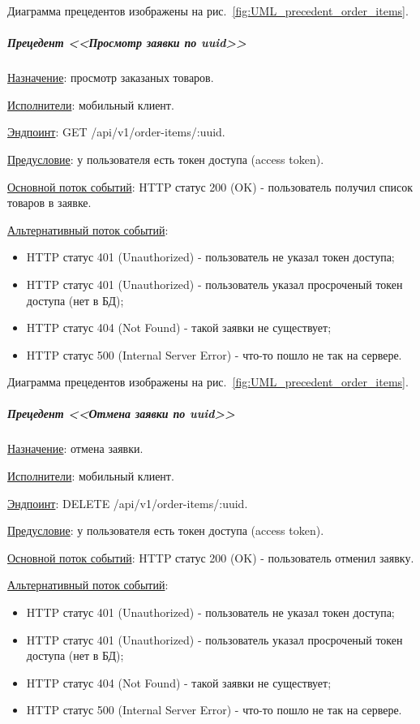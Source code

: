 Диаграмма прецедентов изображены на рис.~\ref{fig:UML_precedent_order_items}.


\subparagraph{Прецедент <<Просмотр заявки по uuid>>} \hspace{0pt}

\underline{Назначение}: просмотр заказаных товаров.

\underline{Исполнители}: мобильный клиент.

\underline{Эндпоинт}: GET /api/v1/order-items/:uuid.

\underline{Предусловие}: у пользователя есть токен доступа (access token).

\underline{Основной поток событий}: HTTP статус 200 (OK) - пользователь получил список товаров в заявке. 

\underline{Альтернативный поток событий}:

\begin{itemize}
    \item HTTP статус 401 (Unauthorized) - пользователь не указал токен доступа;
    \item HTTP статус 401 (Unauthorized) - пользователь указал просроченый токен доступа (нет в БД);
    \item HTTP статус 404 (Not Found) - такой заявки не существует;
    \item HTTP статус 500 (Internal Server Error) - что-то пошло не так на сервере.
\end{itemize}

Диаграмма прецедентов изображены на рис.~\ref{fig:UML_precedent_order_items}.


\subparagraph{Прецедент <<Отмена заявки по uuid>>} \hspace{0pt}

\underline{Назначение}: отмена заявки.

\underline{Исполнители}: мобильный клиент.

\underline{Эндпоинт}: DELETE /api/v1/order-items/:uuid.

\underline{Предусловие}: у пользователя есть токен доступа (access token).

\underline{Основной поток событий}: HTTP статус 200 (OK) - пользователь отменил заявку. 

\underline{Альтернативный поток событий}:

\begin{itemize}
    \item HTTP статус 401 (Unauthorized) - пользователь не указал токен доступа;
    \item HTTP статус 401 (Unauthorized) - пользователь указал просроченый токен доступа (нет в БД);
    \item HTTP статус 404 (Not Found) - такой заявки не существует;
    \item HTTP статус 500 (Internal Server Error) - что-то пошло не так на сервере.
\end{itemize}

